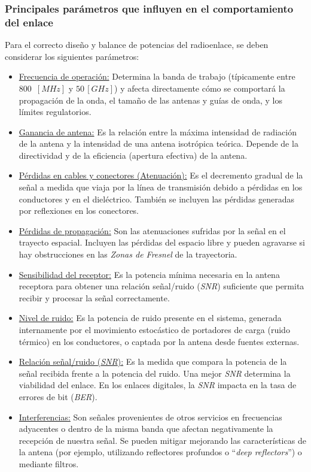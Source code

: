 \subsubsection{Principales parámetros que influyen en el comportamiento del enlace}
\label{sec_2.1.2}
Para el correcto diseño y balance de potencias del radioenlace, se deben considerar los siguientes parámetros:
\begin{itemize}
    \item \underline{Frecuencia de operación:} Determina la banda de trabajo (típicamente entre $800 \,$ $[MHz]$ y $50 \, [GHz]$) y afecta directamente cómo se comportará la propagación de la onda, el tamaño de las antenas y guías de onda, y los límites regulatorios.
    \item \underline{Ganancia de antena:} Es la relación entre la máxima intensidad de radiación de la antena y la intensidad de una antena isotrópica teórica. Depende de la directividad y de la eficiencia (apertura efectiva) de la antena.
    \item \underline{Pérdidas en cables y conectores (Atenuación):} Es el decremento gradual de la señal a medida que viaja por la línea de transmisión debido a pérdidas en los conductores y en el dieléctrico. También se incluyen las pérdidas generadas por reflexiones en los conectores.
    \item \underline{Pérdidas de propagación:} Son las atenuaciones sufridas por la señal en el trayecto espacial. Incluyen las pérdidas del espacio libre y pueden agravarse si hay obstrucciones en las \textit{Zonas de Fresnel} de la trayectoria.
    \item \underline{Sensibilidad del receptor:} Es la potencia mínima necesaria en la antena receptora para obtener una relación señal/ruido (\textit{SNR}) suficiente que permita recibir y procesar la señal correctamente.
    \item \underline{Nivel de ruido:} Es la potencia de ruido presente en el sistema, generada internamente por el movimiento estocástico de portadores de carga (ruido térmico) en los conductores, o captada por la antena desde fuentes externas.
    \item \underline{Relación señal/ruido (\textit{SNR}):} Es la medida que compara la potencia de la señal recibida frente a la potencia del ruido. Una mejor \textit{SNR} determina la viabilidad del enlace. En los enlaces digitales, la \textit{SNR} impacta en la tasa de errores de bit (\textit{BER}).
    \item \underline{Interferencias:} Son señales provenientes de otros servicios en frecuencias adyacentes o dentro de la misma banda que afectan negativamente la recepción de nuestra señal. Se pueden mitigar mejorando las características de la antena (por ejemplo, utilizando reflectores profundos o ``\textit{deep reflectors}'') o mediante filtros.

\end{itemize}
